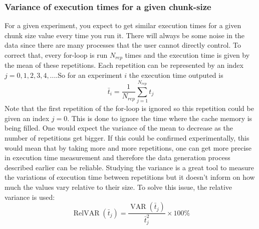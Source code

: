 \documentclass[12pt]{article}
\begin{document}
\subsubsection{Variance of execution times for a given chunk-size}
For a given experiment, you expect to get similar execution times for a given chunk size value every time you run it. There will always be some noise in the data since there are many processes that the user cannot directly control. To correct that, every for-loop is run $N_{rep}$ times and the execution time is given by the mean of these repetitions. Each repetition can be represented by an index $j=0,1,2,3,4,...$.So for an experiment $i$ the execution time outputed is 
$$\bar{t}_i=\frac{1}{N_{rep}}\sum_{j=1}^{N_{rep}}t_j$$
Note that the first repetition of the for-loop is ignored so this repetition could be given an index $j=0$. This is done to ignore the time where the cache memory is being filled.
One would expect the variance of the mean
to decrease as the number of repetitions get bigger. If this could be confirmed experimentally, this would mean that by taking more and more repetitions, one can get more precise in execution time measurement and therefore the data generation process described earlier can be reliable. Studying the variance is a great tool to measure the variations of execution time between repetitions but it doesn't inform on how much the values vary relative to their size. To solve this issue, the relative variance is used:
$$\operatorname{RelVAR}(\bar{t}_j)=\frac{\operatorname{VAR}(\bar{t}_j)}{\bar{t}_j^2}\times 100 \%$$
\end{document}
